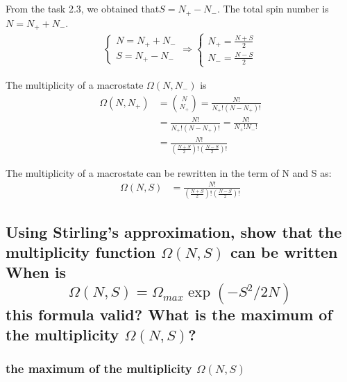 \documentclass[a4paper,11pt]{article}
\begin{document}
\subsection[2.4]{}
From the task 2.3, we obtained that$S = N_+ - N_-$. The total spin number is $N= N_+ + N_-$.
\begin{align*}
\begin{cases}
N = N_+ + N_- \\
S = N_+ - N_-
\end{cases}
\Rightarrow
 \begin{cases} 
N_+ = \frac{N + S}{2}\\
N_- = \frac{N - S}{2}
\end{cases}
\end{align*}

The multiplicity of a macrostate $\Omega(N, N_-)$ is 
\begin{align*}
\Omega(N, N_+) & = \binom{N}{N_+}= \frac{N!}{N_+!(N-N_+)!}
\\
& = \frac{N!}{N_+!(N-N_+)!} 
= \frac{N!}{N_+!N_-!} 
\\
& = \frac{N!}{(\frac{N + S}{2})!(\frac{N - S}{2})!} 
\end{align*}

The multiplicity of a macrostate can be rewritten in the term of N and S as:
\begin{align*}
\Omega(N, S) 
& = \frac{N!}{(\frac{N + S}{2})!(\frac{N - S}{2})!} 
\end{align*}






\subsection[2.5]{Using Stirling’s approximation, show that the multiplicity function $\Omega(N, S)$ can be written	When is $$\Omega(N,S) = \Omega_{max}\exp(-S^2/2	N)$$this formula valid? What is the maximum of the multiplicity  $\Omega(N, S)$?}


\subsubsection{the maximum of the multiplicity $\Omega(N, S)$}
\end{document}
